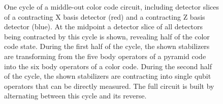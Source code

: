 \documentclass[onecolumn,unpublished,a4paper]{quantumarticle}
\theoremstyle{definition}
\theoremstyle{definition}
\theoremstyle{definition}
\begin{document}
\begin{figure}
    \centering
    \caption{
        One cycle of a middle-out color code circuit, including detector slices of a contracting X basis detector (red) and a contracting Z basis detector (blue).
        At the midpoint a detector slice of all detectors being contracted by this cycle is shown, revealing half of the color code state.
        During the first half of the cycle, the shown stabilizers are transforming from the five body operators of a pyramid code into the six body operators of a color code.
        During the second half of the cycle, the shown stabilizers are contracting into single qubit operators that can be directly measured.
        The full circuit is built by alternating between this cycle and its reverse.
}
\end{figure}
\end{document}
